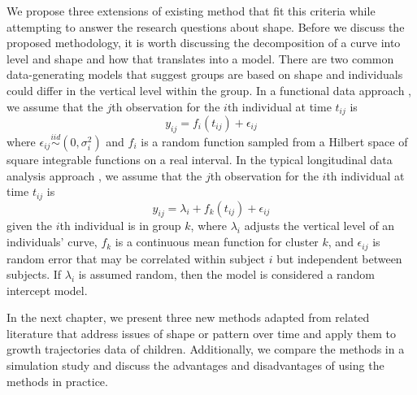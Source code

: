 We propose three extensions of existing method that fit this criteria while attempting to answer the research questions about shape. Before we discuss the proposed methodology, it is worth discussing the decomposition of a curve into level and shape and how that translates into a model. There are two common data-generating models that suggest groups are based on shape and individuals could differ in the vertical level within the group. In a functional data approach \cite{ramsay2002}, we assume that the $j$th observation for the $i$th individual at time $t_{ij}$ is
$$y_{ij}= f_i(t_{ij})+\epsilon_{ij}$$
where $\epsilon_{ij}\overset{iid}{\sim} (0,\sigma_{i}^{2})$ and $f_{i}$ is a random function sampled from a Hilbert space of square integrable functions on a real interval. In the typical longitudinal data analysis  approach \cite{diggle2002}, we assume that the $j$th observation for the $i$th individual at time $t_{ij}$ is
$$y_{ij}=\lambda_{i}+f_k(t_{ij})+\epsilon_{ij}$$
given the $i$th individual is in group $k$, where $\lambda_{i}$ adjusts the vertical level of an individuals' curve, $f_k$ is a continuous mean function for cluster $k$, and $\epsilon_{ij}$ is random error that may be correlated within subject $i$ but independent between subjects. If $\lambda_{i}$ is assumed random, then the model is considered a random intercept model. 

 In the next chapter, we present three new methods adapted from related literature that address issues of shape or pattern over time and apply them to growth trajectories data of children. Additionally, we compare the methods in a simulation study and discuss the advantages and disadvantages of using the methods in practice. 
	
